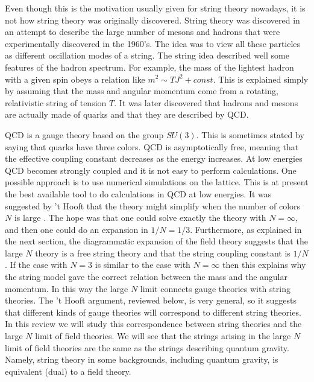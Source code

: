 Even though this is the motivation usually given for string theory
nowadays, it is not how string theory was originally discovered. 
String theory was discovered in an attempt to describe 
the large number of mesons and hadrons that were experimentally 
discovered in the 1960's. The idea was to view all these particles 
as different oscillation modes of a string. 
The string idea described well some features of the 
hadron spectrum. For example,
 the mass of the lightest hadron with a given spin 
obeys a  relation like $m^2 \sim T J^2 + const $. This is explained 
simply by assuming that the mass and angular momentum come
from a rotating, relativistic string of tension $T$. 
It was later discovered that hadrons and mesons  are actually
made of quarks
and that they are described by QCD. 

QCD is a gauge theory based
on the group $SU(3)$. This is sometimes stated by saying that quarks
have three  colors. QCD is asymptotically free, meaning that the 
effective
coupling constant decreases as the energy increases. At low energies
QCD becomes strongly coupled and it is not easy to perform calculations. 
One possible approach is to use numerical simulations on the lattice.
This is at present the best available tool to do calculations in 
QCD at low energies. It was suggested by 't Hooft that 
the theory might simplify when the number of colors $N$ is large
 \cite{'tHooft:1974jz}.
The hope was that one could solve exactly the theory with 
$N = \infty$, and then one could do an expansion in $1/N = 1/3$. 
Furthermore, as explained in the next section, the diagrammatic expansion
of the field theory suggests that the large $N$  theory 
is a free string theory and that the string coupling constant is $1/N$.  
If the case with $N=3$ is similar to the case with $N=\infty$
then this explains why the string model gave the correct relation 
between the mass and the angular momentum. In this way 
the large $N$ limit connects gauge  theories with string theories. 
The 't Hooft argument, reviewed below, is very general, so it suggests
that different kinds of gauge theories will correspond to different 
string theories. In this review we will study this correspondence between
string theories and the large $N$ limit of field theories. We 
will see that the strings arising in the large $N$ limit of field 
theories are the same as the strings describing quantum gravity.
Namely, string theory in some backgrounds, including quantum gravity,
is equivalent (dual) to a field theory.

